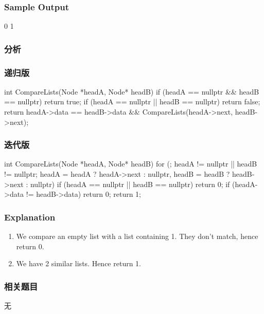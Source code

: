\subsubsection{Sample Output}
\begin{Code}
0
1
\end{Code}


\subsubsection{分析}


\subsubsection{递归版}
\begin{Code}
int CompareLists(Node *headA, Node* headB) {
    if (headA == nullptr && headB == nullptr) return true;
    if (headA == nullptr || headB == nullptr) return false;
    return headA->data == headB->data  && CompareLists(headA->next, headB->next);
}
\end{Code}


\subsubsection{迭代版}
\begin{Code}
int CompareLists(Node *headA, Node* headB) {
    for (; headA != nullptr || headB != nullptr; 
        headA = headA ? headA->next : nullptr,
        headB = headB ? headB->next : nullptr) {
        if (headA == nullptr || headB == nullptr) return 0;
        if (headA->data != headB->data) return 0;
    }
    return 1;
}
\end{Code}


\subsubsection{Explanation}
\begin{enumerate}
\item We compare an empty list with a list containing 1. They don’t match, hence return 0.
\item We have 2 similar lists. Hence return 1.
\end{enumerate}


\subsubsection{相关题目}
\begindot
\item 无
\myenddot


